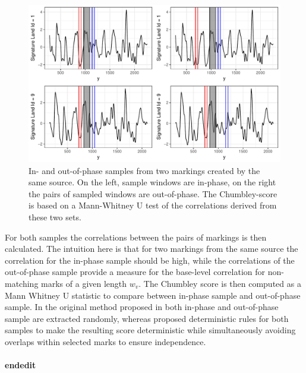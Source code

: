 \documentclass[12pt]{article}
\begin{document}
\begin{figure}

{\centering \includegraphics[width=\textwidth]{figures/win-comparison-1} 

}

\caption{In- and out-of-phase samples from two markings created by the same source. On the left, sample windows are in-phase, on the right the pairs of sampled windows are out-of-phase. The Chumbley-score is based on a Mann-Whitney U test of the correlations derived from these two sets.}\label{fig:win-comparison}
\end{figure}

For both samples the correlations between the pairs of markings is then
calculated. The intuition here is that for two markings from the same
source the correlation for the in-phase sample should be high, while the
correlations of the out-of-phase sample provide a measure for the
base-level correlation for non-matching marks of a given length \(w_v\).
The Chumbley score is then computed as a Mann Whitney U statistic to
compare between in-phase sample and out-of-phase sample. In the original
method proposed in \citet{chumbley} both in-phase and out-of-phase
sample are extracted randomly, whereas \citet{hadler} proposed
deterministic rules for both samples to make the resulting score
deterministic while simultaneously avoiding overlaps within selected
marks to ensure independence.

\paragraph{endedit}\label{endedit}

\end{document}
